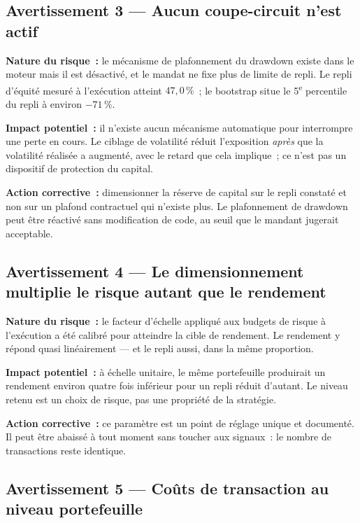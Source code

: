 \subsection{Avertissement 3 --- Aucun coupe-circuit n'est actif}

\begin{warningbox}
\textbf{Nature du risque~:} le mécanisme de plafonnement du drawdown existe dans le moteur mais il est désactivé, et le mandat ne fixe plus de limite de repli. Le repli d'équité mesuré à l'exécution atteint $47{,}0\,\%$~; le bootstrap situe le 5\textsuperscript{e} percentile du repli à environ $-71\,\%$.

\textbf{Impact potentiel~:} il n'existe aucun mécanisme automatique pour interrompre une perte en cours. Le ciblage de volatilité réduit l'exposition \emph{après} que la volatilité réalisée a augmenté, avec le retard que cela implique~; ce n'est pas un dispositif de protection du capital.

\textbf{Action corrective~:} dimensionner la réserve de capital sur le repli constaté et non sur un plafond contractuel qui n'existe plus. Le plafonnement de drawdown peut être réactivé sans modification de code, au seuil que le mandant jugerait acceptable.
\end{warningbox}

\subsection{Avertissement 4 --- Le dimensionnement multiplie le risque autant que le rendement}

\begin{warningbox}
\textbf{Nature du risque~:} le facteur d'échelle appliqué aux budgets de risque à l'exécution a été calibré pour atteindre la cible de rendement. Le rendement y répond quasi linéairement --- et le repli aussi, dans la même proportion.

\textbf{Impact potentiel~:} à échelle unitaire, le même portefeuille produirait un rendement environ quatre fois inférieur pour un repli réduit d'autant. Le niveau retenu est un choix de risque, pas une propriété de la stratégie.

\textbf{Action corrective~:} ce paramètre est un point de réglage unique et documenté. Il peut être abaissé à tout moment sans toucher aux signaux~: le nombre de transactions reste identique.
\end{warningbox}

\subsection{Avertissement 5 --- Coûts de transaction au niveau portefeuille}

